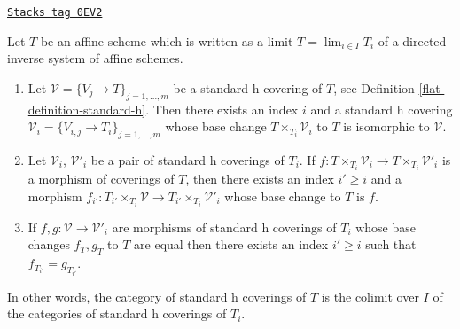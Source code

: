 \begin{lemma}
\label{flat-lemma-limit-h-topology}
\href{https://stacks.math.columbia.edu/tag/0EV2}{\texttt{Stacks tag 0EV2}}

Let $T$ be an affine scheme which is written as a limit
$T = \lim_{i \in I} T_i$ of a directed inverse system of affine schemes.
\begin{enumerate}
\item Let $\mathcal{V} = \{V_j \to T\}_{j = 1, \ldots, m}$ be a
standard h covering of $T$, see Definition
\ref{flat-definition-standard-h}.
Then there exists an index $i$ and a standard h covering
$\mathcal{V}_i = \{V_{i, j} \to T_i\}_{j = 1, \ldots, m}$
whose base change $T \times_{T_i} \mathcal{V}_i$ to $T$
is isomorphic to $\mathcal{V}$.
\item Let $\mathcal{V}_i$, $\mathcal{V}'_i$ be a pair of standard
h coverings of $T_i$. If
$f : T \times_{T_i} \mathcal{V}_i \to T \times_{T_i} \mathcal{V}'_i$ is
a morphism of coverings of $T$, then there exists an index
$i' \geq i$ and a morphism
$f_{i'} : T_{i'} \times_{T_i} \mathcal{V} \to
T_{i'} \times_{T_i} \mathcal{V}'_i$
whose base change to $T$ is $f$.
\item If
$f, g : \mathcal{V} \to \mathcal{V}'_i$
are morphisms of standard h coverings of $T_i$ whose
base changes $f_T, g_T$ to $T$ are equal then there exists an
index $i' \geq i$ such that $f_{T_{i'}} = g_{T_{i'}}$.
\end{enumerate}
In other words, the category of standard h coverings of $T$ is
the colimit over $I$ of the categories of standard h coverings of $T_i$.
\end{lemma}

